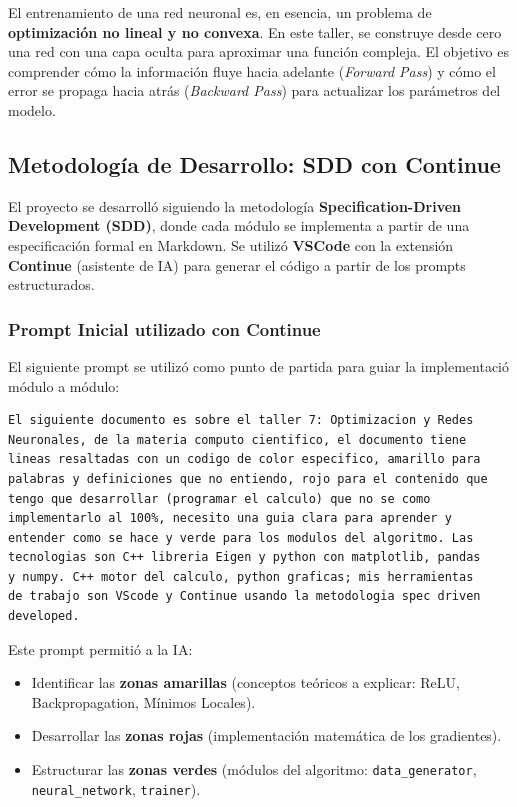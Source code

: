 \documentclass[12pt,a4paper]{article}
\theoremstyle{definition}
\begin{document}
El entrenamiento de una red neuronal es, en esencia, un problema de \textbf{optimizaci\'{o}n no lineal y no convexa}. En este taller, se construye desde cero una red con una capa oculta para aproximar una funci\'{o}n compleja. El objetivo es comprender c\'{o}mo la informaci\'{o}n fluye hacia adelante (\textit{Forward Pass}) y c\'{o}mo el error se propaga hacia atr\'{a}s (\textit{Backward Pass}) para actualizar los par\'{a}metros del modelo.

\subsection{Metodolog\'{i}a de Desarrollo: SDD con Continue}

El proyecto se desarroll\'{o} siguiendo la metodolog\'{i}a \textbf{Specification-Driven Development (SDD)}, donde cada m\'{o}dulo se implementa a partir de una especificaci\'{o}n formal en Markdown. Se utiliz\'{o} \textbf{VSCode} con la extensi\'{o}n \textbf{Continue} (asistente de IA) para generar el c\'{o}digo a partir de los prompts estructurados.

\subsubsection{Prompt Inicial utilizado con Continue}

El siguiente prompt se utiliz\'{o} como punto de partida para guiar la implementaci\'{o} m\'{o}dulo a m\'{o}dulo:

\begin{lstlisting}[caption={Prompt inicial para Continue en VSCode.}, label={lst:prompt}]
El siguiente documento es sobre el taller 7: Optimizacion y Redes
Neuronales, de la materia computo cientifico, el documento tiene
lineas resaltadas con un codigo de color especifico, amarillo para
palabras y definiciones que no entiendo, rojo para el contenido que
tengo que desarrollar (programar el calculo) que no se como
implementarlo al 100%, necesito una guia clara para aprender y
entender como se hace y verde para los modulos del algoritmo. Las
tecnologias son C++ libreria Eigen y python con matplotlib, pandas
y numpy. C++ motor del calculo, python graficas; mis herramientas
de trabajo son VScode y Continue usando la metodologia spec driven
developed.
\end{lstlisting}

Este prompt permiti\'{o} a la IA:
\begin{itemize}
    \item Identificar las \textbf{zonas amarillas} (conceptos te\'{o}ricos a explicar: ReLU, Backpropagation, M\'{i}nimos Locales).
    \item Desarrollar las \textbf{zonas rojas} (implementaci\'{o}n matem\'{a}tica de los gradientes).
    \item Estructurar las \textbf{zonas verdes} (m\'{o}dulos del algoritmo: \texttt{data\_generator}, \texttt{neural\_network}, \texttt{trainer}).
\end{itemize}
\end{document}
